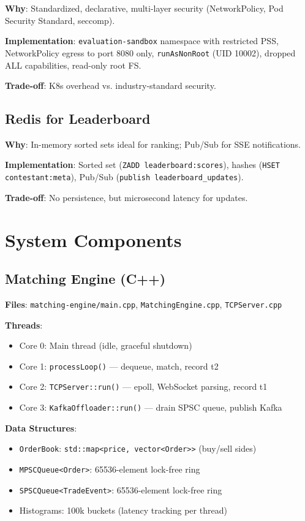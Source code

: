 \documentclass[10pt,a4paper,oneside]{report}
\begin{document}
\textbf{Why}: Standardized, declarative, multi-layer security (NetworkPolicy, Pod Security Standard, seccomp).

\textbf{Implementation}: \texttt{evaluation-sandbox} namespace with restricted PSS, NetworkPolicy egress to port 8080 only, \texttt{runAsNonRoot} (UID 10002), dropped ALL capabilities, read-only root FS.

\textbf{Trade-off}: K8s overhead vs. industry-standard security.

\section{Redis for Leaderboard}

\textbf{Why}: In-memory sorted sets ideal for ranking; Pub/Sub for SSE notifications.

\textbf{Implementation}: Sorted set (\texttt{ZADD leaderboard:scores}), hashes (\texttt{HSET contestant:meta}), Pub/Sub (\texttt{publish leaderboard\_updates}).

\textbf{Trade-off}: No persistence, but microsecond latency for updates.

\chapter{System Components}

\section{Matching Engine (C++)}

\textbf{Files}: \texttt{matching-engine/main.cpp}, \texttt{MatchingEngine.cpp}, \texttt{TCPServer.cpp}

\textbf{Threads}:
\begin{itemize}
    \item Core 0: Main thread (idle, graceful shutdown)
    \item Core 1: \texttt{processLoop()} — dequeue, match, record t2
    \item Core 2: \texttt{TCPServer::run()} — epoll, WebSocket parsing, record t1
    \item Core 3: \texttt{KafkaOffloader::run()} — drain SPSC queue, publish Kafka
\end{itemize}

\textbf{Data Structures}:
\begin{itemize}
    \item \texttt{OrderBook}: \texttt{std::map<price, vector<Order>>} (buy/sell sides)
    \item \texttt{MPSCQueue<Order>}: 65536-element lock-free ring
    \item \texttt{SPSCQueue<TradeEvent>}: 65536-element lock-free ring
    \item Histograms: 100k buckets (latency tracking per thread)
\end{itemize}
\end{document}
